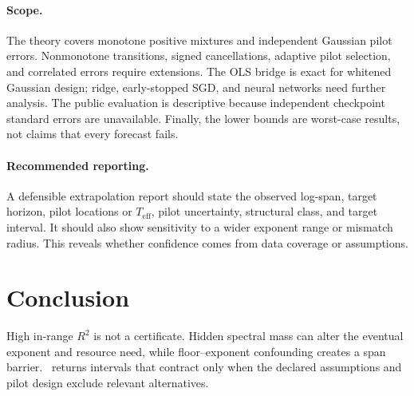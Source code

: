 \paragraph{Scope.}
The theory covers monotone positive mixtures and independent Gaussian pilot errors. Nonmonotone transitions, signed cancellations, adaptive pilot selection, and correlated errors require extensions. The OLS bridge is exact for whitened Gaussian design; ridge, early-stopped SGD, and neural networks need further analysis. The public evaluation is descriptive because independent checkpoint standard errors are unavailable. Finally, the lower bounds are worst-case results, not claims that every forecast fails.

\paragraph{Recommended reporting.}
A defensible extrapolation report should state the observed log-span, target horizon, pilot locations or $T_{\mathrm{eff}}$, pilot uncertainty, structural class, and target interval. It should also show sensitivity to a wider exponent range or mismatch radius. This reveals whether confidence comes from data coverage or assumptions.

\section{Conclusion}

High in-range $R^2$ is not a certificate. Hidden spectral mass can alter the eventual exponent and resource need, while floor--exponent confounding creates a span barrier. \ScaleCert\ returns intervals that contract only when the declared assumptions and pilot design exclude relevant alternatives.
